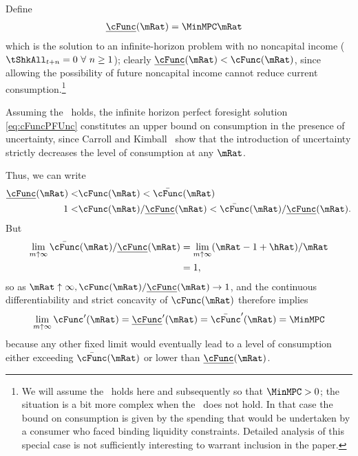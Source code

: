 \documentclass[BufferStockTheory]{subfiles}
\begin{document}
Define
\begin{equation}\begin{gathered}\begin{aligned}
  \underline{\cFunc}(\mRat)  & = \MinMPC \mRat \nonumber
\end{aligned}\end{gathered}\end{equation}
which is the solution to an infinite-horizon problem with no noncapital
income
($\tShkAll_{t+n} = 0~\forall~n\geq1$); 
clearly $\underline{\cFunc}(\mRat)
< \cFunc(\mRat)$, since allowing the possibility of future noncapital
income cannot reduce current consumption.\footnote{We will assume the
  \RIC~holds here and subsequently so that $\MinMPC > 0$; the situation
  is a bit more complex when the \RIC~does not hold.   In that case the bound on consumption is given by the spending
  that would be undertaken by a consumer who faced binding liquidity
  constraints.  Detailed analysis of this special case is not
  sufficiently interesting to warrant inclusion in the paper.}

Assuming the \FHWC~holds, the infinite horizon perfect
foresight solution \eqref{eq:cFuncPFUnc} constitutes an upper
bound on consumption in the presence of uncertainty, since Carroll and
Kimball~\citeyearpar{ckConcavity} show that the introduction of
uncertainty strictly decreases the level of consumption at any $\mRat$.

Thus, we can write
\begin{equation}\begin{gathered}\begin{aligned}  
  \underline{\cFunc}(\mRat) < & \cFunc(\mRat)  < \bar{\cFunc}(\mRat) \label{eq:lowerltupper} \\
  1 < & \cFunc(\mRat)/\underline{\cFunc}(\mRat)  < \bar{\cFunc}(\mRat)/\underline{\cFunc}(\mRat). \nonumber
\end{aligned}\end{gathered}\end{equation}
But
\begin{equation}\begin{gathered}\begin{aligned}  \label{eq:limitlowerupper}
  \lim_{m \uparrow \infty} \bar{\cFunc}(\mRat)/\underline{\cFunc}(\mRat) 
  & = \lim_{m \uparrow \infty} (\mRat -1+ \hRat)/\mRat \nonumber \\
  & = 1, \nonumber
\end{aligned}\end{gathered}\end{equation}
so as $\mRat \uparrow \infty, \cFunc(\mRat)/\underline{\cFunc}(\mRat)
\rightarrow 1$, and the continuous differentiability and strict
concavity of $\cFunc(\mRat)$ therefore implies
\begin{equation}  \label{eq:limxtoinftycp}
  \lim_{m \uparrow \infty} \cFunc^{\prime}(\mRat) =
  \underline{\cFunc}^{\prime}(\mRat) = \bar{\cFunc}^{\prime}(\mRat) = \MinMPC \notag
\end{equation}
because any other fixed limit would eventually lead to a level of
consumption either exceeding $\bar{\cFunc}(\mRat)$ or lower than
$\underline{\cFunc}(\mRat)$.
\end{document}
